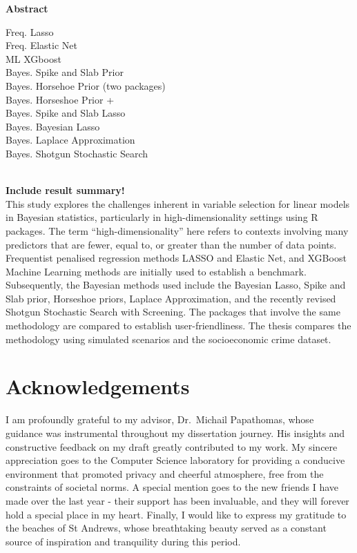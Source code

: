\documentclass[
  11pt,
]{article}
\author{}
\date{\vspace{-2.5em}}
\begin{document}
\onehalfspacing

\begin{center}
    {\Large \textbf{Abstract}}
\end{center}

\vspace{0.5cm}

\noindent 

\hfill\break
Freq. Lasso\\
Freq. Elastic Net\\
ML XGboost\\
Bayes. Spike and Slab Prior\\
Bayes. Horsehoe Prior (two packages)\\
Bayes. Horseshoe Prior +\\
Bayes. Spike and Slab Lasso\\
Bayes. Bayesian Lasso\\
Bayes. Laplace Approximation\\
Bayes. Shotgun Stochastic Search\\
\strut \\
\textbf{Include result summary!}\\
This study explores the challenges inherent in variable selection for
linear models in Bayesian statistics, particularly in
high-dimensionality settings using R packages. The term
``high-dimensionality'' here refers to contexts involving many
predictors that are fewer, equal to, or greater than the number of data
points. Frequentist penalised regression methods LASSO and Elastic Net,
and XGBoost Machine Learning methods are initially used to establish a
benchmark. Subsequently, the Bayesian methods used include the Bayesian
Lasso, Spike and Slab prior, Horseshoe priors, Laplace Approximation,
and the recently revised Shotgun Stochastic Search with Screening. The
packages that involve the same methodology are compared to establish
user-friendliness. The thesis compares the methodology using simulated
scenarios and the socioeconomic crime dataset.\\

\newpage

\tableofcontents

\newpage

\section{Acknowledgements}

I am profoundly grateful to my advisor, Dr.~Michail Papathomas, whose
guidance was instrumental throughout my dissertation journey. His
insights and constructive feedback on my draft greatly contributed to my
work. My sincere appreciation goes to the Computer Science laboratory
for providing a conducive environment that promoted privacy and cheerful
atmosphere, free from the constraints of societal norms. A special
mention goes to the new friends I have made over the last year - their
support has been invaluable, and they will forever hold a special place
in my heart. Finally, I would like to express my gratitude to the
beaches of St Andrews, whose breathtaking beauty served as a constant
source of inspiration and tranquility during this period.
\end{document}
